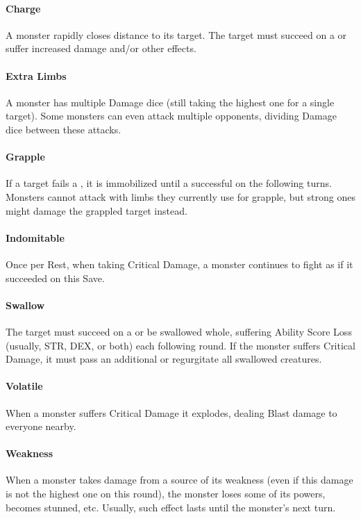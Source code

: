 \documentclass[itdr]{subfiles}
\begin{document}
\paragraph{Charge}
A monster rapidly closes distance to its target. The target must succeed on a  or suffer increased damage and/or other effects.

\paragraph{Extra Limbs}
A monster has multiple Damage dice (still taking the highest one for a single target). Some monsters can even attack multiple opponents, dividing Damage dice between these attacks.

\paragraph{Grapple}
If a target fails a , it is immobilized until a successful  on the following turns. Monsters cannot attack with limbs they currently use for grapple, but strong ones might damage the grappled target instead.

\paragraph{Indomitable}
Once per Rest, when taking Critical Damage, a monster continues to fight as if it succeeded on this Save.

\paragraph{Swallow}
The target must succeed on a  or be swallowed whole, suffering Ability Score Loss (usually, STR, DEX, or both) each following round. If the monster suffers Critical Damage, it must pass an additional  or regurgitate all swallowed creatures.

\paragraph{Volatile}
When a monster suffers Critical Damage it explodes, dealing Blast damage to everyone nearby.

\paragraph{Weakness}
When a monster takes damage from a source of its weakness (even if this damage is not the highest one on this round), the monster loses some of its powers, becomes stunned, etc. Usually, such effect lasts until the monster's next turn.
\end{document}
